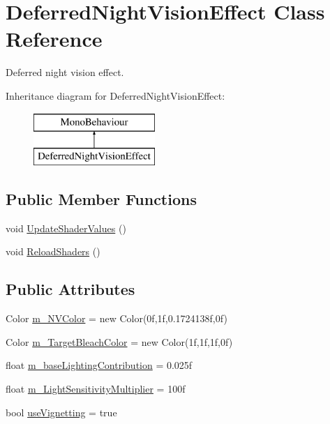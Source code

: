 \hypertarget{class_deferred_night_vision_effect}{}\section{Deferred\+Night\+Vision\+Effect Class Reference}
\label{class_deferred_night_vision_effect}


Deferred night vision effect.  


Inheritance diagram for Deferred\+Night\+Vision\+Effect\+:\begin{figure}[H]
\begin{center}
\leavevmode
\includegraphics[height=2.000000cm]{class_deferred_night_vision_effect}
\end{center}
\end{figure}
\subsection*{Public Member Functions}
\begin{DoxyCompactItemize}
\item 
void \mbox{\hyperlink{class_deferred_night_vision_effect_a9b901a59c7f42e8c06eb1a146feb3630}{Update\+Shader\+Values}} ()
\item 
void \mbox{\hyperlink{class_deferred_night_vision_effect_ad89297ec17aafe350994cd2e50c60d04}{Reload\+Shaders}} ()
\end{DoxyCompactItemize}
\subsection*{Public Attributes}
\begin{DoxyCompactItemize}
\item 
Color \mbox{\hyperlink{class_deferred_night_vision_effect_a3de7782fd3a6bad61c8a36337ee6d866}{m\+\_\+\+N\+V\+Color}} = new Color(0f,1f,0.\+1724138f,0f)
\item 
Color \mbox{\hyperlink{class_deferred_night_vision_effect_a0795a2e0edfcd98f45a3bff925de3087}{m\+\_\+\+Target\+Bleach\+Color}} = new Color(1f,1f,1f,0f)
\item 
float \mbox{\hyperlink{class_deferred_night_vision_effect_a7abc2888e53a1d0d56aefed48a0382fa}{m\+\_\+base\+Lighting\+Contribution}} = 0.\+025f
\item 
float \mbox{\hyperlink{class_deferred_night_vision_effect_afc9c93cc243856cd171b50458cbc5136}{m\+\_\+\+Light\+Sensitivity\+Multiplier}} = 100f
\item 
bool \mbox{\hyperlink{class_deferred_night_vision_effect_ae1ce2b75c78229d6d85a87ac7fb7ebc6}{use\+Vignetting}} = true
\end{DoxyCompactItemize}
